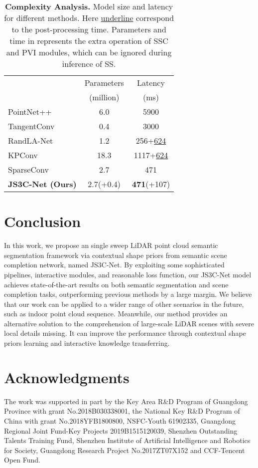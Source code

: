 \documentclass[letterpaper]{article} \usepackage{aaai21}  \usepackage{times}  \usepackage{helvet} \usepackage{courier}  \usepackage[hyphens]{url}  \usepackage{graphicx} \urlstyle{rm} \def\UrlFont{\rm}  \usepackage{natbib}  \usepackage{booktabs}
\begin{document}
	\begin{table}
	\small
		\caption{\textbf{Complexity Analysis.} Model size and latency for different methods. Here {\underline{underline}} correspond to the post-processing time.
Parameters and time in  represents the extra operation of SSC and PVI modules, which can be ignored during inference of SS.
		}
		\begin{center}

		\begin{tabular}{lcc}
			\hline
    		& Parameters & Latency \\
    		& (million) & (ms) \\
    		\hline
    		\hline
    		PointNet++&  6.0 & 5900  \\
    		TangentConv&  0.4 & 3000  \\
    		RandLA-Net &  1.2 &  {{256}}+{\underline{624}} \\
    		KPConv &  18.3 &  {{1117}}+{\underline{624}} \\
    		SparseConv &  2.7 & {471} \\
    		\textbf{JS3C-Net (Ours)} &  2.7(+0.4)& \textbf{471}(+107) \\

			\hline
    	\end{tabular}
		\end{center}
		
		\label{tab:compl}
\end{table}
	
	\section{Conclusion}
	In this work, we propose an single sweep LiDAR point cloud semantic segmentation framework via contextual shape priors from semantic scene completion network, named JS3C-Net. 
	By exploiting some sophisticated pipelines, interactive modules, and reasonable loss function, our JS3C-Net model achieves state-of-the-art results on both semantic segmentation and scene completion tasks, outperforming previous methods by a large margin. We believe that our work can be applied to a wider range of other scenarios in the future, such as indoor point cloud sequence. Meanwhile, our method provides an alternative solution to the comprehension of large-scale LiDAR scenes with severe local details missing. It can improve the performance through contextual shape priors learning and interactive knowledge transferring.
	
	\clearpage
	\newpage
	\section*{Acknowledgments}
    The work was supported in part by the Key Area R\&D Program of Guangdong Province with grant No.2018B030338001, the National Key R\&D Program of China with grant No.2018YFB1800800, NSFC-Youth 61902335, Guangdong Regional Joint Fund-Key Projects 2019B1515120039, Shenzhen Outstanding Talents Training Fund, Shenzhen Institute of Artificial Intelligence and Robotics for Society, Guangdong Research Project No.2017ZT07X152 and CCF-Tencent Open Fund.
\end{document}
